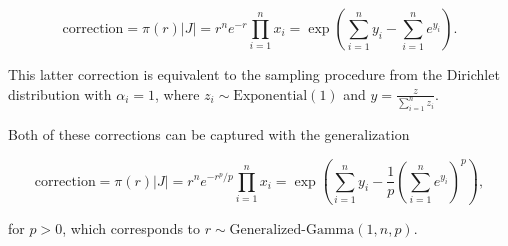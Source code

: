 \documentclass[twoside]{article}
\begin{document}
$$\mathrm{correction} = \pi(r) |J| = r^n e^{-r} \prod_{i=1}^n x_i = \exp\left(\sum_{i=1}^n y_i - \sum_{i=1}^n e^{y_i}\right).$$

This latter correction is equivalent to the sampling procedure from the Dirichlet distribution with $\alpha_i=1$, where $z_i \sim \mathrm{Exponential}(1)$ and $y = \frac{z}{\sum_{i=1}^n z_i}$.

Both of these corrections can be captured with the generalization

$$\mathrm{correction} = \pi(r) |J| = r^n e^{-r^p/p} \prod_{i=1}^n x_i = \exp\left(\sum_{i=1}^n y_i - \frac{1}{p} \left(\sum_{i=1}^n e^{y_i}\right)^p\right),$$

for $p > 0$, which corresponds to $r \sim \text{Generalized-Gamma}(1, n, p)$.

\vfill
\end{document}
